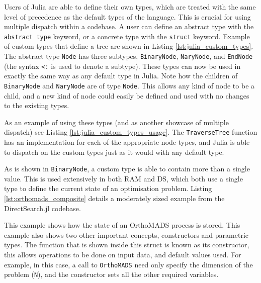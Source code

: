 Users of Julia are able to define their own types, which are treated with the same level of precedence as the default types of the language. This is crucial for using multiple dispatch within a codebase. A user can define an abstract type with the \texttt{abstract type} keyword, or a concrete type with the \texttt{struct} keyword. Example of custom types that define a tree are shown in Listing \ref{lst:julia_custom_types}. The abstract type \texttt{Node} has three subtypes, \texttt{BinaryNode}, \texttt{NaryNode}, and \texttt{EndNode} (the syntax \texttt{<:} is used to denote a subtype). These types can now be used in exactly the same way as any default type in Julia. Note how the children of \texttt{BinaryNode} and \texttt{NaryNode} are of type \texttt{Node}. This allows any kind of node to be a child, and a new kind of node could easily be defined and used with no changes to the existing types.



As an example of using these types (and as another showcase of multiple dispatch) see Listing \ref{lst:julia_custom_types_usage}. The \texttt{TraverseTree} function has an implementation for each of the appropriate node types, and Julia is able to dispatch on the custom types just as it would with any default type.



As is shown in \texttt{BinaryNode}, a custom type is able to contain more than a single value. This is used extensively in both \ac{RAM} and \ac{DS}, which both use a single type to define the current state of an optimisation problem. Listing \ref{lst:orthomads_composite} details a moderately sized example from the DirectSearch.jl codebase.

This example shows how the state of an \ac{OrthoMADS} process is stored. This example also shows two other important concepts, constructors and parametric types. The function that is shown inside this struct is known as its constructor, this allows operations to be done on input data, and default values used. For example, in this case, a call to \texttt{OrthoMADS} need only specify the dimension of the problem (\texttt{N}), and the constructor sets all the other required variables. 

